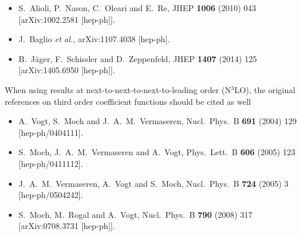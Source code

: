 \documentclass[12pt,a4]{article}
\begin{document}
\begin{itemize}
\item S.~Alioli, P.~Nason, C.~Oleari and E.~Re,
  JHEP {\bf 1006} (2010) 043
  [arXiv:1002.2581 [hep-ph]].
\item J.~Baglio {\it et al.},
  arXiv:1107.4038 [hep-ph].
\item B.~J\"ager, F.~Schissler and D.~Zeppenfeld,
  JHEP {\bf 1407} (2014) 125
  [arXiv:1405.6950 [hep-ph]].
\end{itemize}

When using results at next-to-next-to-next-to-leading order (N$^3$LO), the
original references on third order coefficient functions should be
cited as well
\begin{itemize}
\item A.~Vogt, S.~Moch and J.~A.~M.~Vermaseren,
  Nucl.\ Phys.\ B {\bf 691} (2004) 129
  [hep-ph/0404111].
\item S.~Moch, J.~A.~M.~Vermaseren and A.~Vogt,
  Phys.\ Lett.\ B {\bf 606} (2005) 123
  [hep-ph/0411112].
\item J.~A.~M.~Vermaseren, A.~Vogt and S.~Moch,
  Nucl.\ Phys.\ B {\bf 724} (2005) 3
  [hep-ph/0504242].
\item S.~Moch, M.~Rogal and A.~Vogt,
  Nucl.\ Phys.\ B {\bf 790} (2008) 317
  [arXiv:0708.3731 [hep-ph]].
\end{itemize}

\end{document}
